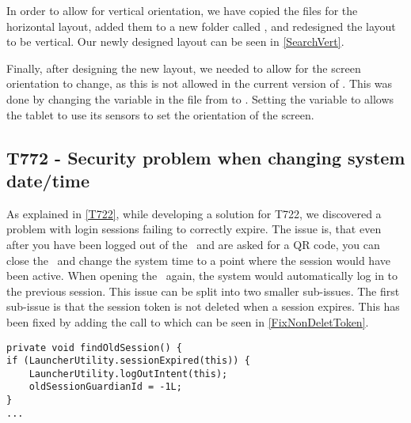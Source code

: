     
In order to allow for vertical orientation, we have copied the files for the
horizontal layout, added them to a new folder called , and
redesigned the layout to be vertical. Our newly designed layout can be seen in
\autoref{SearchVert}.


Finally, after designing the new layout, we needed to allow for the screen
orientation to change, as this is not allowed in the current version of
\plib. This was done by changing the 
variable in the  file from  to
. Setting the variable to  allows the tablet
to use its sensors to set the orientation of the screen. 

\subsection{T772 - Security problem when changing system date/time}\label{T772}
As explained in \autoref{T722}, while developing a solution for T722, we
discovered a problem with login sessions failing to correctly expire.
The issue is, that even after you have been logged out of the \lapp\ and are
asked for a QR code, you can close the \lapp\ and change the system time to a
point where the session would have been active. When opening the \lapp\ again,
the system would automatically log in to the previous session. This issue can be split
into two smaller sub-issues. The first sub-issue is that the session token is
not deleted when a session expires. This has been fixed by adding the call to
 which can be seen in \autoref{FixNonDeletToken}.\nl

\begin{minipage}[H]{\linewidth}
\begin{lstlisting}[caption = Our solution to not clearing the token, label =
FixNonDeletToken] 
private void findOldSession() {
if (LauncherUtility.sessionExpired(this)) {
	LauncherUtility.logOutIntent(this);
    oldSessionGuardianId = -1L;
}
...
\end{lstlisting} 
\end{minipage}


